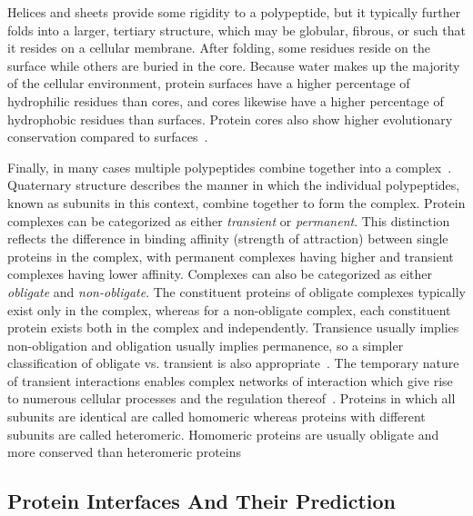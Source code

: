 Helices and sheets provide some rigidity to a polypeptide, but it typically further folds into a larger, tertiary structure, which may be globular, fibrous, or such that it resides on a cellular membrane.
After folding, some residues reside on the surface while others are buried in the core.
Because water makes up the majority of the cellular environment, protein surfaces have a higher percentage of hydrophilic residues than cores, and cores likewise have a higher percentage of hydrophobic residues than surfaces. 
Protein cores also show higher evolutionary conservation compared to surfaces~\cite{yan2008}.


Finally, in many cases multiple polypeptides combine together into a complex~\cite{scheeffink2003}.
Quaternary structure describes the manner in which the individual polypeptides, known as subunits in this context, combine together to form the complex.
Protein complexes can be categorized as either \emph{transient} or \emph{permanent}.
This distinction reflects the difference in binding affinity (strength of attraction) between single proteins in the complex, with permanent complexes having higher and transient complexes having lower affinity.
Complexes can also be categorized as either \emph{obligate} and \emph{non-obligate}.
The constituent proteins of obligate complexes typically exist only in the complex, whereas for a non-obligate complex, each constituent protein exists both in the complex and independently.
Transience usually implies non-obligation and obligation usually implies permanence, so a simpler classification of obligate vs. transient is also appropriate~\cite{jones1996, perkins2010}.
The temporary nature of transient interactions enables complex networks of interaction which give rise to numerous cellular processes and the regulation thereof~\cite{perkins2010, ofran2003}.
Proteins in which all subunits are identical are called homomeric whereas proteins with different subunits are called heteromeric.
Homomeric proteins are usually obligate and more conserved than heteromeric proteins~\cite{jones1996}\cite{yan2008}



\subsection{Protein Interfaces And Their Prediction}

